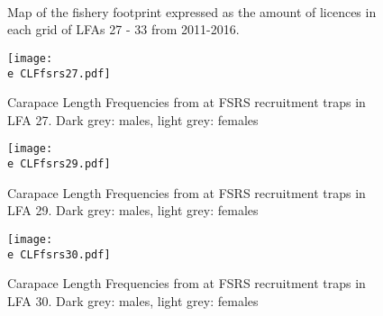\documentclass[11pt]{article}
\newcommand{\e}{\string~/bio.data/bio.lobster/figures/LFA2733Framework2018/} %
\begin{document}
        \begin{figure}
        \centering
                \\
                \\
                \\
        
         \caption{Map of the fishery footprint expressed as the amount of licences in each grid of LFAs 27 - 33 from 2011-2016.}
        \end{figure}

    \begin{figure}
    \centering
        \texttt{[image: \\e CLFfsrs27.pdf]}
        \caption{Carapace Length Frequencies from at FSRS recruitment traps in LFA 27. Dark grey: males, light grey: females}

    \end{figure}


    \begin{figure}
    \centering
        \texttt{[image: \\e CLFfsrs29.pdf]}
        \caption{Carapace Length Frequencies from at FSRS recruitment traps in LFA 29. Dark grey: males, light grey: females}

    \end{figure}


    \begin{figure}
    \centering
        \texttt{[image: \\e CLFfsrs30.pdf]}
        \caption{Carapace Length Frequencies from at FSRS recruitment traps in LFA 30. Dark grey: males, light grey: females}

    \end{figure}
\end{document}

